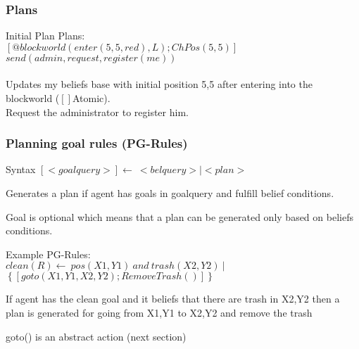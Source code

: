  \begin{frame}
    \frametitle{Plans}
    \begin{block}{Initial Plan}
      Plans:\\
      \tab $[@blockworld(enter(5,5,red),L);ChPos(5,5) ]$\\
      \tab $send(admin,request,register(me))$\\~\\
      Updates my beliefs base with initial position 5,5 after entering into the blockworld ($[]$Atomic). \\
      Request the administrator to register him.
    \end{block}
  \end{frame}
  \begin{frame}
    \frametitle{Planning goal rules (PG-Rules)}
    \begin{block}{Syntax}
      $[<goalquery>]\leftarrow\ <belquery> | <plan> $ \\
      \begin{itemize}
      	{\small
        \item Generates a plan if agent has goals in goalquery and fulfill belief conditions.
        \item Goal is optional which means that a plan can be generated only based on beliefs conditions.
	    }
      \end{itemize}
    \end{block}
    
    \begin{block}{Example}
    {\small
      PG-Rules:\\
      \tab $clean(R)\leftarrow \ pos(X1,Y1)\ and\ trash(X2,Y2)\ |$ 
      \tab \tab $\left\{[goto(X1,Y1,X2,Y2); RemoveTrash()]\right\} $ \\
    }
      \begin{itemize}{\small
        \item If agent has the clean goal and it beliefs that there are trash in X2,Y2 then a plan is generated for going from X1,Y1 to X2,Y2 and remove the trash
        \item goto() is an abstract action (next section)
	  }
      \end{itemize}
    \end{block}
    
  \end{frame}
  
